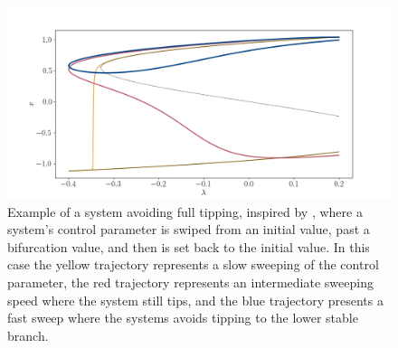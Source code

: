 

\begin{figure}
	\centering
	\includegraphics[width=0.9\linewidth]{Images/Metrics/overshoot2}
	\caption{Example of a system avoiding full tipping, inspired by \cite{Ritchie2021}, where a system's control parameter is swiped from an initial value, past a bifurcation value, and then is set back to the initial value.  In this case the yellow trajectory represents a slow sweeping of the control parameter, the red trajectory represents an intermediate sweeping speed where the system still tips, and the blue trajectory presents a fast sweep where the systems avoids tipping to the lower stable branch.   }
	\label{fig:overshootsaving}
\end{figure}



% 

